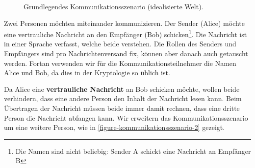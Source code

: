 \begin{figure}[htb]
\caption{Grundlegendes Kommunikationsszenario (idealisierte Welt).}
\label{figure-kommunikationsszenario-1}
\end{figure}

Zwei Personen möchten miteinander kommunizieren. Der Sender (Alice) möchte eine vertrauliche Nachricht an den Empfänger (Bob) schicken\footnote{Die Namen sind nicht beliebig: Sender A schickt eine Nachricht an Empfänger B}. Die Nachricht ist in einer Sprache verfasst, welche beide verstehen. Die Rollen des Senders und Empfängers sind pro Nachrichtenversand fix, können aber danach auch getauscht werden. Fortan verwenden wir für die Kommunikationsteilnehmer die Namen Alice und Bob, da dies in der Kryptologie so üblich ist. 

Da Alice eine \textbf{vertrauliche Nachricht} an Bob schicken möchte, wollen beide verhindern, dass eine andere Person den Inhalt der Nachricht lesen kann. Beim Übertragen der Nachricht müssen beide immer damit rechnen, dass eine dritte Person die Nachricht abfangen kann. Wir erweitern das Kommunikationsszenario um eine weitere Person, wie in \autoref{figure-kommunikationsszenario-2} gezeigt.

